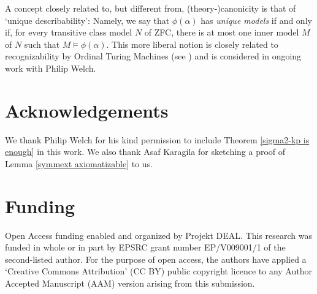 \documentclass[a4paper,12pt]{amsart}
\theoremstyle{definition}
\begin{document}
A concept closely related to, but different from, (theory-)canonicity is that of `unique describability': Namely, we say that $\phi(\alpha)$ has \textit{unique models} if and only if, for every transitive class model $N$ of ZFC, there is at most one inner model $M$ of $N$ such that $M\models\phi(\alpha)$. This more liberal notion is closely related to recognizability by Ordinal Turing Machines (see \cite{CSW}) and is considered in ongoing work with Philip Welch. 

\section{Acknowledgements}

We thank Philip Welch for his kind permission to include Theorem \ref{sigma2-kp is enough} in this work. We also thank Asaf Karagila for sketching a proof of Lemma \ref{symmext axiomatizable} to us. 


\section{Funding} 
Open Access funding enabled and organized by Projekt DEAL. 
This research was funded in whole or in part by EPSRC grant number EP/V009001/1 of the second-listed author. For the purpose of open access, the authors have applied a `Creative Commons Attribution' (CC BY) public copyright licence to any Author Accepted Manuscript (AAM) version arising from this submission. 
\end{document}
